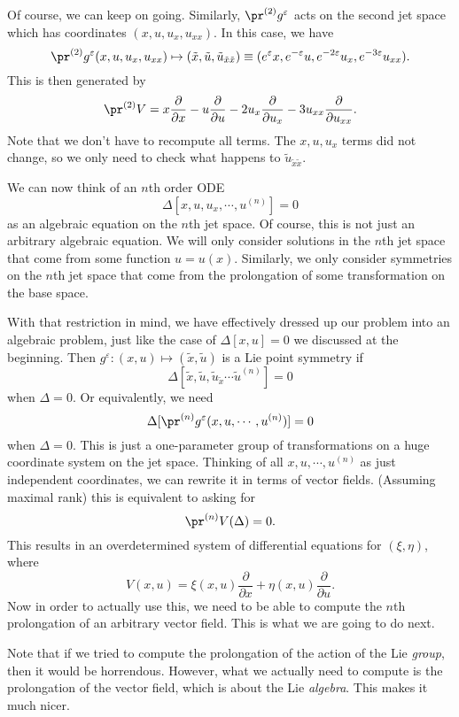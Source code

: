\documentclass[a4paper]{article}
\begin{document}
Of course, we can keep on going. Similarly, $\pr^{(2)} g^\varepsilon$ acts on the second jet space which has coordinates $(x, u, u_x, u_{xx})$. In this case, we have
\[
  \pr^{(2)} g^\varepsilon (x, u, u_x, u_{xx}) \mapsto (\tilde{x}, \tilde{u}, \tilde{u}_{\tilde{x}\tilde{x}}) \equiv (e^\varepsilon x, e^{-\varepsilon}u, e^{-2\varepsilon} u_x, e^{-3\varepsilon}u_{xx}).
\]
This is then generated by
\[
  \pr^{(2)}V = x\frac{\partial}{\partial x} - u \frac{\partial}{\partial u} - 2 u_x \frac{\partial}{\partial u_x} - 3 u_{xx} \frac{\partial}{\partial u_{xx}}.
\]
Note that we don't have to recompute all terms. The $x, u, u_x$ terms did not change, so we only need to check what happens to $\tilde{u}_{\tilde{x}\tilde{x}}$.

We can now think of an $n$th order ODE
\[
  \Delta[x, u, u_x, \cdots, u^{(n)}] = 0
\]
as an algebraic equation on the $n$th jet space. Of course, this is not just an arbitrary algebraic equation. We will only consider solutions in the $n$th jet space that come from some function $u = u(x)$. Similarly, we only consider symmetries on the $n$th jet space that come from the prolongation of some transformation on the base space.

With that restriction in mind, we have effectively dressed up our problem into an algebraic problem, just like the case of $\Delta[x, u] = 0$ we discussed at the beginning. Then $g^\varepsilon: (x, u) \mapsto (\tilde{x}, \tilde{u})$ is a Lie point symmetry if
\[
  \Delta[\tilde{x}, \tilde{u}, \tilde{u}_{\tilde{x}} \cdots \tilde{u}^{(n)}] = 0
\]
when $\Delta = 0$. Or equivalently, we need
\[
  \Delta[\pr^{(n)} g^\varepsilon(x, u, \cdots, u^{(n)})] = 0
\]
when $\Delta = 0$. This is just a one-parameter group of transformations on a huge coordinate system on the jet space. Thinking of all $x, u, \cdots, u^{(n)}$ as just independent coordinates, we can rewrite it in terms of vector fields. (Assuming maximal rank) this is equivalent to asking for
\[
  \pr^{(n)}V (\Delta) = 0.
\]
This results in an overdetermined system of differential equations for $(\xi, \eta)$, where
\[
  V(x, u) = \xi(x, u) \frac{\partial}{\partial x} + \eta(x, u) \frac{\partial}{\partial u}.
\]
Now in order to actually use this, we need to be able to compute the $n$th prolongation of an arbitrary vector field. This is what we are going to do next.

Note that if we tried to compute the prolongation of the action of the Lie \emph{group}, then it would be horrendous. However, what we actually need to compute is the prolongation of the vector field, which is about the Lie \emph{algebra}. This makes it much nicer.
\end{document}
